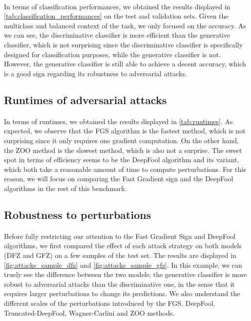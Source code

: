 \documentclass[10pt,twocolumn,letterpaper]{article}
\begin{document}
\paragraph{} In terms of classification performances, we obtained the results displayed in \cref{tab:classification_performances} on the test and validation sets. Given the multiclass and balanced context of the task, we only focused on the accuracy. As we can see, the discriminative classifier is more efficient than the generative classifier, which is not surprising since the discriminative classifier is specifically designed for classification purposes, while the generative classifier is not. However, the generative classifier is still able to achieve a decent accuracy, which is a good sign regarding its robustness to adversarial attacks.

\subsection{Runtimes of adversarial attacks}

\paragraph{} In terms of runtimes, we obtained the results displayed in \cref{tab:runtimes}. As expected, we observe that the FGS algorithm is the fastest method, which is not surprising since it only requires one gradient computation. On the other hand, the ZOO method is the slowest method, which is also not a surprise. The sweet spot in terms of efficiency seems to be the DeepFool algorithm and its variant, which both take a reasonable amount of time to compute perturbations. For this reason, we will focus on comparing the Fast Gradient sign and the DeepFool algorithms in the rest of this benchmark.

\subsection{Robustness to perturbations}

\paragraph{} Before fully restricting our attention to the Fast Gradient Sign and DeepFool algorithms, we first compared the effect of each attack strategy on both models (DFZ and GFZ) on a few samples of the test set. The results are displayed in \cref{fig:attacks_sample_dfz} and \cref{fig:attacks_sample_gfz}. In this example, we can truely see the difference between the two models; the generative classifier is more robust to adversarial attacks than the discriminative one, in the sense that it requires larger perturbations to change its predictions. We also understand the different scales of the perturbations introduced by the FGS, DeepFool, Truncated-DeepFool, Wagner-Carlini and ZOO methods.
\end{document}
